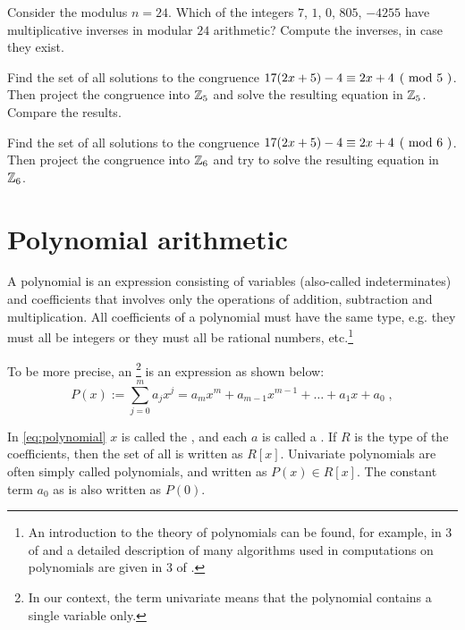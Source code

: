 \begin{exercise}
Consider the modulus $n=24$. Which of the integers $7$, $1$, $0$, $805$, $-4255$ have multiplicative inverses in modular $24$ arithmetic? Compute the inverses, in case they exist.
\end{exercise}
\begin{exercise}
Find the set of all solutions to the congruence $\kongru{17(2x+5)-4}{2x+4}{5}$. Then project the congruence into $\mathbb{Z}_5$ and solve the resulting equation in $\mathbb{Z}_5$. Compare the results.
\end{exercise}
\begin{exercise}
Find the set of all solutions to the congruence $\kongru{17(2x+5)-4}{2x+4}{6}$. Then project the congruence into $\mathbb{Z}_6$ and try to solve the resulting equation in $\mathbb{Z}_6$.
\end{exercise}
\section{Polynomial arithmetic}
\label{sec:polynomial_arithmetics}
A polynomial is an expression consisting of variables (also-called indeterminates) and coefficients that involves only the operations of addition, subtraction and multiplication. All coefficients of a polynomial must have the same type, e.g. they must all be integers or they must all be rational numbers, etc.\footnote{An introduction to the theory of polynomials can be found, for example, in \chaptname{} 3 of \cite{mignotte-1992} and a detailed description of many algorithms used in computations on polynomials are given in \chaptname{} 3 of \cite{cohen-2010}.}

To be more precise, an \footnote{In our context, the term univariate means that the polynomial contains a single variable only.}  is an expression  as shown below:
\begin{equation}\label{eq:polynomial}
P(x) := \sum _{j = 0} ^{m}{a} _{j}{x} ^{j} ={a} _{m}x^m +{a} _{m-1} x^{m-1} + \dots + a_1 x + a_0 \;,
\end{equation}

In \eqref{eq:polynomial} $x$ is called the , and each $ a$ is called a . If $R$ is the type of the coefficients, then the set of all  is written as $R[x]$. Univariate polynomials are often simply called polynomials, and written as $ P (x) \in R[x]$. The constant term $a_0$ as is also written as $ P(0)$.

